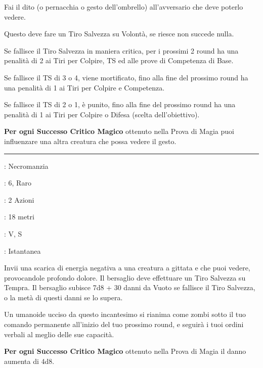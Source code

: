 \begin{multicols}{2}
Fai il dito (o pernacchia o gesto dell'ombrello) all'avversario che deve poterlo vedere.

Questo deve fare un Tiro Salvezza su Volontà, se riesce non succede nulla.

Se fallisce il Tiro Salvezza in maniera critica, per i prossimi 2 round ha una penalità di 2 ai Tiri per Colpire, TS ed alle prove di Competenza di Base.

Se fallisce il TS di 3 o 4, viene mortificato, fino alla fine del prossimo round ha una penalità di 1 ai Tiri per Colpire e Competenza.

Se fallisce il TS di 2 o 1, è punito, fino alla fine del prossimo round ha una penalità di 1 ai Tiri per Colpire o Difesa (scelta dell'obiettivo).

\textbf{Per ogni Successo Critico Magico} ottenuto nella Prova di Magia puoi influenzare una altra creatura che possa vedere il gesto.

\smallskip\noindent\rule{\linewidth}{2pt} \hypertarget{Dito della Morte}{}\smallskip{}
\noindent
\begin{description}[noitemsep, topsep=0pt, parsep=0pt, partopsep=0pt, leftmargin=0cm, labelwidth=2.8cm]
	\item[\textbf{Lista di Magia}]: Necromanzia
	\item[\textbf{Livello}]: 6, Raro
	\item[\textbf{T. di Lancio}]: 2 Azioni
	\item[\textbf{Gittata}]: 18 metri
	\item[\textbf{Componenti}]: V, S
	\item[\textbf{Durata}]: Istantanea
\end{description}

Invii una scarica di energia negativa a una creatura a gittata e che puoi vedere, provocandole profondo dolore. Il bersaglio deve effettuare un Tiro Salvezza su Tempra. Il bersaglio subisce 7d8 + 30 danni da Vuoto se fallisce il Tiro Salvezza, o la metà di questi danni se lo supera.

Un umanoide ucciso da questo incantesimo si rianima come zombi sotto il tuo comando permanente all'inizio del tuo prossimo round, e seguirà i tuoi ordini verbali al meglio delle sue capacità.

\textbf{Per ogni Successo Critico Magico} ottenuto nella Prova di Magia il danno aumenta di 4d8.


\end{multicols}
